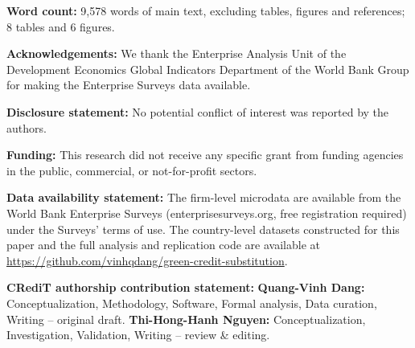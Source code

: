 \documentclass[review,authoryear,12pt]{elsarticle}
\begin{document}
\vspace{0.5cm}
\noindent\textbf{Word count:} 9{,}578 words of main text, excluding tables, figures and references; 8 tables and 6 figures.

\vspace{0.5cm}
\noindent\textbf{Acknowledgements:} We thank the Enterprise Analysis Unit of the Development Economics Global Indicators Department of the World Bank Group for making the Enterprise Surveys data available.

\vspace{0.5cm}
\noindent\textbf{Disclosure statement:} No potential conflict of interest was reported by the authors.

\vspace{0.5cm}
\noindent\textbf{Funding:} This research did not receive any specific grant from funding agencies in the public, commercial, or not-for-profit sectors.

\vspace{0.5cm}
\noindent\textbf{Data availability statement:} The firm-level microdata are available from the World Bank Enterprise Surveys (enterprisesurveys.org, free registration required) under the Surveys' terms of use. The country-level datasets constructed for this paper and the full analysis and replication code are available at \url{https://github.com/vinhqdang/green-credit-substitution}.

\vspace{0.5cm}
\noindent\textbf{CRediT authorship contribution statement:} \textbf{Quang-Vinh Dang:} Conceptualization, Methodology, Software, Formal analysis, Data curation, Writing -- original draft. \textbf{Thi-Hong-Hanh Nguyen:} Conceptualization, Investigation, Validation, Writing -- review \& editing.
\end{document}
